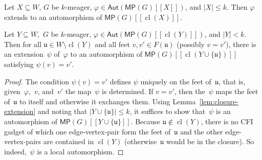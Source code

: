 \documentclass[]{lmcs}
\renewcommand{\phi}{\varphi}
\newcommand{\set}[1]{\lbrace #1 \rbrace}
\newcommand{\autoA}{\phi}
\newcommand{\autoB}{\psi}
\newcommand{\autGroup}[1]{\mathsf{Aut}(#1)}
\newcommand{\vertB}{v}
\newcommand{\bVertA}{\mathfrak{u}}
\newcommand{\multipede}[1]{\mathsf{MP}(#1)}
\newcommand{\feetb}{W}
\newcommand{\footbset}{X}
\newcommand{\footbsetB}{Y}
\newcommand{\closure}[1]{\operatorname{cl}(#1)}
\newcommand{\footinduced}[2]{#1[[#2]]}
\newcommand{\feetOf}[1]{F(#1)}
\begin{document}
\begin{lemC}
	\label{lem:closure-extension}
	Let $\footbset \subseteq \feetb$, $G$ be $k$-meager,
	$\autoA\in \autGroup{\footinduced{\multipede{G}}{\footbset}}$,
	and $|\footbset| \leq k$.
	Then $\autoA$ extends to an automorphism of $\footinduced{\multipede{G}}{\closure{\footbset}}$.
\end{lemC}
\begin{lem}
	\label{lem:closure-extension-new}
	Let $\footbsetB \subseteq \feetb$,~$G$ be $k$-meager,
	$\autoA\in \autGroup{\footinduced{\multipede{G}}{\closure{\footbsetB}}}$,
	and $|\footbsetB| < k$.
	Then for all $\bVertA \in \feetb \setminus \closure{\footbsetB}$
	and all feet $\vertB, \vertB' \in \feetOf{\bVertA}$ (possibly $\vertB=\vertB'$),
	there is an extension~$\autoB$ of~$\autoA$ to an automorphism of $\footinduced{\multipede{G}}{\closure{\footbsetB \cup \set{\bVertA}}}$
	satisfying $\autoB(\vertB) = \vertB'$.
\end{lem}
\begin{proof}
	The condition $\autoB(\vertB) = \vertB'$ defines $\autoB$ uniquely
	on the feet of~$\bVertA$,
	that is, given~$\autoA$,~$\vertB$, and~$\vertB'$ the map~$\autoB$ is determined.
	If $\vertB = \vertB'$, then the~$\autoB$ maps the feet of~$\bVertA$
	to itself and otherwise it exchanges them.
	Using Lemma~\ref{lem:closure-extension} 
	and noting that $|\footbsetB \cup \set{\bVertA}| \leq k$,
	it suffices to show that~$\autoB$ is an automorphism of 
	$\footinduced{\multipede{G}}{\footbsetB \cup \set{\bVertA}}$.
	Because $\bVertA \notin \closure{\footbsetB}$,
	there is no CFI gadget of which one edge-vertex-pair form the feet of~$\bVertA$
	and the other  edge-vertex-pairs are contained in $\closure{\footbsetB}$
	(otherwise~$\bVertA$ would be in the closure).
	So indeed,~$\autoB$ is a local automorphism.
\end{proof}
\end{document}

